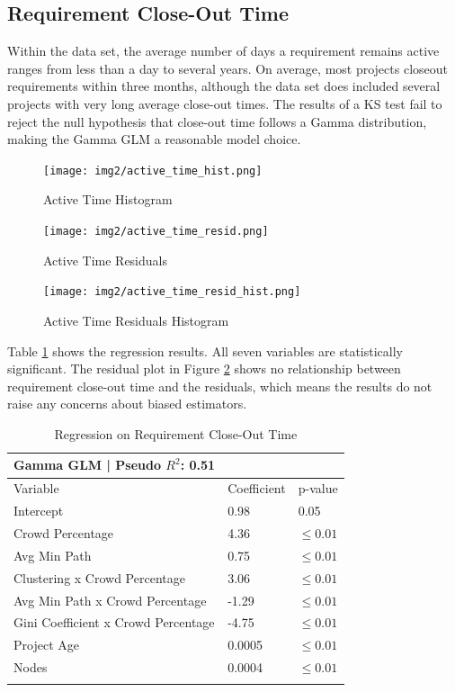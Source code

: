 \subsection{Requirement Close-Out Time}

Within the data set, the average number of days a requirement remains active ranges from less than a day to several years. On average, most projects closeout requirements within three months, although the data set does included several projects with very long average close-out times. The results of a KS test fail to reject the null hypothesis that close-out time follows a Gamma distribution, making the Gamma GLM a reasonable model choice.

\begin{figure}
  \texttt{[image: img2/active\_time\_hist.png]}
\caption{Active Time Histogram}
\label{active_time_hist}
\end{figure}

\begin{figure}
  \texttt{[image: img2/active\_time\_resid.png]}
\caption{Active Time Residuals}
\label{active_time_resid}
\end{figure}

\begin{figure}
  \texttt{[image: img2/active\_time\_resid\_hist.png]}
\caption{Active Time Residuals Histogram}
\label{active_time_resid_hist}
\end{figure}

Table \ref{active_time_regression} shows the regression results. All seven variables are statistically significant. The residual plot in Figure \ref{active_time_resid} shows no relationship between requirement close-out time and the residuals, which means the results do not raise any concerns about biased estimators.

\begin{table}
\caption{Regression on Requirement Close-Out Time}
\label{active_time_regression}
\begin{tabular}{lll}
Gamma GLM | Pseudo $R^2$: 0.51 \\
\hline\noalign{\smallskip}
Variable & Coefficient & p-value  \\
\noalign{\smallskip}\hline\noalign{\smallskip}
Intercept & 0.98 & 0.05 \\
Crowd Percentage & 4.36 & $\leq 0.01$  \\
Avg Min Path & 0.75 & $\leq 0.01$ \\
Clustering x Crowd Percentage & 3.06 & $\leq 0.01$ \\
Avg Min Path x Crowd Percentage & -1.29 & $\leq 0.01$ \\
Gini Coefficient x Crowd Percentage & -4.75 & $\leq 0.01$ \\
Project Age & 0.0005 & $\leq 0.01$ \\
Nodes & 0.0004 & $\leq 0.01$ \\
\noalign{\smallskip}\hline
\end{tabular}
\end{table}


